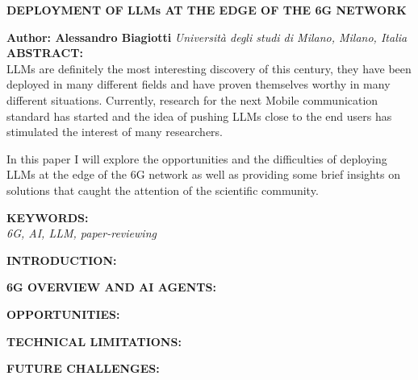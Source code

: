\documentclass[a4paper,10pt]{article}
\begin{document}
\noindent
\begin{center}
	\textbf{{\Large DEPLOYMENT OF LLMs AT THE EDGE OF THE 6G NETWORK}} \\
\end{center}

\noindent
\textbf{Author: Alessandro Biagiotti} \hfill \textit{Università degli studi di Milano, Milano, Italia}
\\

\noindent
\textbf{ABSTRACT:}
\\
LLMs are definitely the most interesting discovery of this century, they have been deployed in many different fields and have proven themselves worthy in many different situations. Currently, research for the next Mobile communication standard has started and the idea of pushing LLMs close to the end users has stimulated the interest of many researchers.

In this paper I will explore the opportunities and the difficulties of deploying LLMs at the edge of the 6G network as well as providing some brief insights on solutions that caught the attention of the scientific community.

\bigskip
\noindent
\textbf{KEYWORDS:}
\\
\textit{6G, AI, LLM, paper-reviewing}

\clearpage

\noindent
\textbf{INTRODUCTION:}
\label{sec:introduction}
\\

\clearpage

\noindent
\textbf{6G OVERVIEW AND AI AGENTS:}
\makeatletter\def\@currentlabel{\texttt{(I)}}\makeatother
\label{sec:ai-agents}
\\

\clearpage


\noindent
\textbf{OPPORTUNITIES:}
\makeatletter\def\@currentlabel{\texttt{(II)}}\makeatother
\label{sec:opportunities}
\\

\clearpage


\noindent
\textbf{TECHNICAL LIMITATIONS:}
\makeatletter\def\@currentlabel{\texttt{(III)}}\makeatother
\label{sec:technical-limitations}
\\

\clearpage


\noindent
\textbf{FUTURE CHALLENGES:}
\makeatletter\def\@currentlabel{\texttt{(IV)}}\makeatother
\label{sec:future-challenges}
\\


\clearpage
\printbibliography
\end{document}
